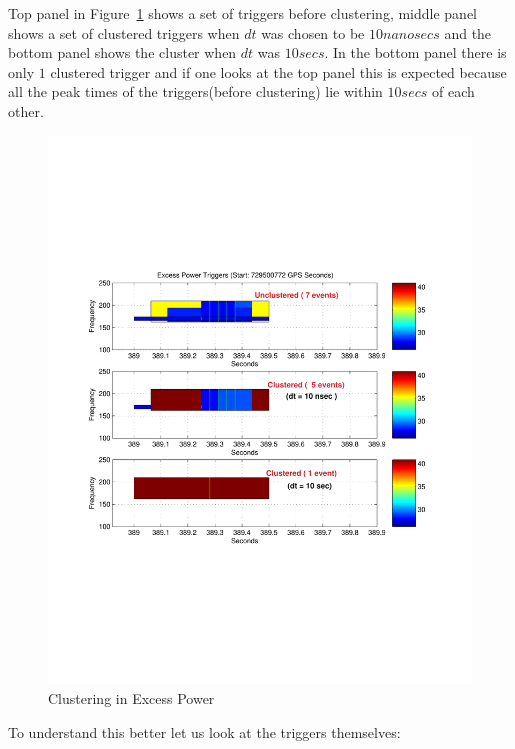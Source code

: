 Top panel in Figure~\ref{fig:checkcluster}  shows a set of triggers before 
clustering,  middle panel shows a set of clustered triggers when $dt$
was chosen to be $10  nanosecs$ and the bottom panel shows the cluster when
$dt$ was $10  secs$. In the bottom panel there is only $1$
clustered trigger and if one looks at the top panel this is expected because
all the peak  times of the triggers(before clustering)  lie within 
$10  secs$ of each other.
\begin{figure}
\centering
\includegraphics[width=1.0\textwidth]{figures/checkclustering_dt10nsec10sec}
\caption{Clustering in Excess Power}
\label{fig:checkcluster}
\end{figure}


To understand this better let us look at the triggers themselves:

\vspace{0.1 in}

